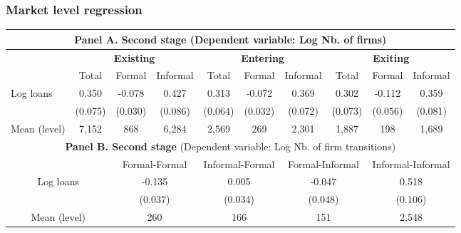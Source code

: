 \documentclass[aspectratio=169]{beamer}
\begin{document}

\begin{frame}[noframenumbering]
\frametitle{\textbf{Market level regression}} \label{llm_level}

\begin{center}
    \scriptsize
    \begin{tabular}{lccccccccc}
        \toprule
        \multicolumn{10}{c}{\textbf{Panel A. Second stage} (Dependent variable: Log Nb. of firms)} \\
        \midrule
         & \multicolumn{3}{c}{\textbf{Existing}} & \multicolumn{3}{c}{\textbf{Entering}} & \multicolumn{3}{c}{\textbf{Exiting}} \\
        \cmidrule(lr){2-10}
        & Total 
        & Formal 
        & \multicolumn{1}{c}{Informal}
        & Total 
        & Formal 
        & \multicolumn{1}{c}{Informal}
        & Total 
        & Formal 
        & Informal \\
        \midrule
        Log loans 
        &  0.350  & -0.078  & 0.427   &  0.313  & -0.072   & 0.369  & 0.302   & -0.112   & 0.359 \\
        & (0.075) & (0.030) & (0.086) & (0.064) & (0.032) & (0.072) & (0.073) & (0.056) & (0.081) \\
        \midrule
        Mean (level) & 7,152 & 868 & 6,284 & 2,569 & 269 & 2,301 & 1,887 & 198 & 1,689\\
        \midrule
        
        \multicolumn{10}{c}{\textbf{Panel B. Second stage} (Dependent variable: Log Nb. of firm transitions)} \\
        
        \midrule
        \multicolumn{2}{c}{} & \multicolumn{2}{c}{Formal-Formal} & \multicolumn{2}{c}{Informal-Formal} & \multicolumn{2}{c}{Formal-Informal} & \multicolumn{2}{c}{Informal-Informal} \\
        \cmidrule(lr){3-10}
        \multicolumn{2}{c}{Log loans} & \multicolumn{2}{c}{-0.135} & \multicolumn{2}{c}{0.005} & \multicolumn{2}{c}{-0.047} & \multicolumn{2}{c}{0.518} \\
        \multicolumn{2}{c}{} & \multicolumn{2}{c}{(0.037)} & \multicolumn{2}{c}{(0.034)} & \multicolumn{2}{c}{(0.048)} & \multicolumn{2}{c}{(0.106)} \\
        \midrule
        \multicolumn{2}{c}{Mean (level)} & \multicolumn{2}{c}{260} & \multicolumn{2}{c}{166} & \multicolumn{2}{c}{151} & \multicolumn{2}{c}{2,548} \\
        
        \bottomrule
    \end{tabular}
\end{center}

\hyperlink{main_result}{}

\end{frame}
\end{document}
